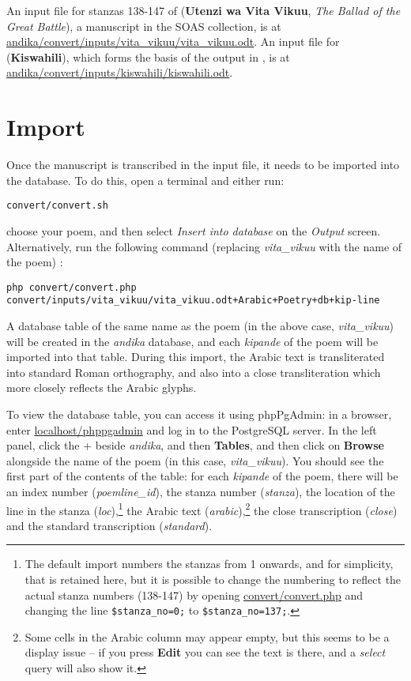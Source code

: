 An input file for stanzas 138-147 of  (\textbf{Utenzi wa Vita Vikuu}, \textit{The Ballad of the Great Battle}), a manuscript in the SOAS collection, is at \url{andika/convert/inputs/vita_vikuu/vita_vikuu.odt}.  An input file for  (\textbf{Kiswahili}), which forms the basis of the output in , is at \url{andika/convert/inputs/kiswahili/kiswahili.odt}.


\section{Import}
\label{s:import}

Once the manuscript is transcribed in the input file, it needs to be imported into the database.  To do this, open a terminal and either run:

\verb|convert/convert.sh|

choose your poem, and then select \textit{Insert into database} on the \textit{Output} screen.  Alternatively, run the following command (replacing \textit{vita_vikuu} with the name of the poem) :

\verb|php convert/convert.php convert/inputs/vita_vikuu/vita_vikuu.odt+Arabic+Poetry+db+kip-line|

A database table of the same name as the poem (in the above case, \textit{vita_vikuu}) will be created in the \textit{andika} database, and each \textit{kipande} of the poem will be imported into that table.  During this import, the Arabic text is transliterated into standard Roman orthography, and also into a close transliteration which more closely reflects the Arabic glyphs.

To view the database table, you can access it using phpPgAdmin: in a browser, enter \url{localhost/phppgadmin} and log in to the PostgreSQL server.  In the left panel, click the + beside \textit{andika}, and then \textbf{Tables}, and then click on \textbf{Browse} alongside the name of the poem (in this case, \textit{vita_vikuu}).  You should see the first part of the contents of the table: for each \textit{kipande} of the poem, there will be an index number (\textit{poemline_id}), the stanza number (\textit{stanza}), the location of the line in the stanza (\textit{loc}),\footnote{The default import numbers the stanzas from 1 onwards, and for simplicity, that is retained here, but it is possible to change the numbering to reflect the actual stanza numbers (138-147) by opening \url{convert/convert.php} and changing the line \texttt{\$stanza_no=0;} to \texttt{\$stanza_no=137;}.} the Arabic text (\textit{arabic}),\footnote{Some cells in the Arabic column may appear empty, but this seems to be a display issue -- if you press \textbf{Edit} you can see the text is there, and a \textit{select} query will also show it.} the close transcription (\textit{close}) and the standard transcription (\textit{standard}).


